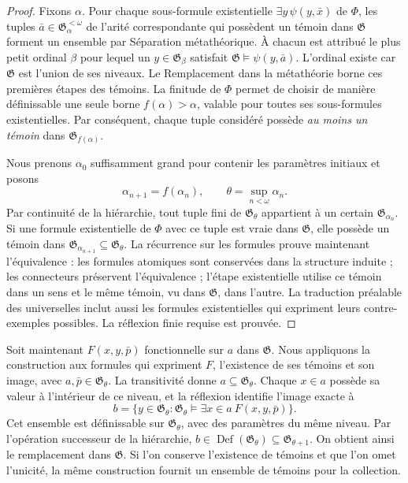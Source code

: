 \begin{proof}
Fixons \(\alpha\). Pour chaque sous-formule existentielle
\(\exists y\,\psi(y,\bar x)\) de \(\Phi\), les tuples
\(\bar a\in\mathfrak G_\alpha^{<\omega}\) de l’arité correspondante
qui possèdent un témoin dans \(\mathfrak G\) forment un ensemble par Séparation
métathéorique. À chacun est attribué le plus petit ordinal \(\beta\) pour lequel
un \(y\in\mathfrak G_\beta\) satisfait
\(\mathfrak G\models\psi(y,\bar a)\). L’ordinal existe car
\(\mathfrak G\) est l’union de ses niveaux. Le Remplacement dans la métathéorie
borne ces premières étapes des témoins. La finitude de \(\Phi\) permet
de choisir de manière définissable une seule borne \(f(\alpha)>\alpha\), valable pour
toutes ses sous-formules existentielles. Par conséquent, chaque tuple considéré possède
\emph{au moins un témoin} dans \(\mathfrak G_{f(\alpha)}\).

Nous prenons \(\alpha_0\) suffisamment grand pour contenir les paramètres
initiaux et posons
\[
 \alpha_{n+1}=f(\alpha_n),\qquad
 \theta=\sup_{n<\omega}\alpha_n.
\]
Par continuité de la hiérarchie, tout tuple fini de
\(\mathfrak G_\theta\) appartient à un certain \(\mathfrak G_{\alpha_n}\).
Si une formule existentielle de \(\Phi\) avec ce tuple est vraie dans
\(\mathfrak G\), elle possède un témoin dans
\(\mathfrak G_{\alpha_{n+1}}\subseteq\mathfrak G_\theta\).
La récurrence sur les formules prouve maintenant l’équivalence : les formules atomiques
sont conservées dans la structure induite ; les connecteurs préservent
l’équivalence ; l’étape existentielle utilise ce témoin dans un sens et le
même témoin, vu dans \(\mathfrak G\), dans l’autre. La traduction préalable
des universelles inclut aussi les formules existentielles qui expriment
leurs contre-exemples possibles. La réflexion finie requise est prouvée.
\end{proof}

Soit maintenant \(F(x,y,\bar p)\) fonctionnelle sur \(a\) dans \(\mathfrak G\). Nous appliquons la construction aux formules qui expriment \(F\), l'existence de ses témoins et son image, avec \(a,\bar p\in\mathfrak G_\theta\). La transitivité donne \(a\subseteq\mathfrak G_\theta\). Chaque \(x\in a\) possède sa valeur à l'intérieur de ce niveau, et la réflexion identifie l'image exacte à
\[
 b=\{y\in\mathfrak G_\theta:
       \mathfrak G_\theta\models
       \exists x\in a\ F(x,y,\bar p)\}.
\]
Cet ensemble est définissable sur \(\mathfrak G_\theta\), avec des paramètres du même niveau. Par l'opération successeur de la hiérarchie, \(b\in\operatorname{Def}(\mathfrak G_\theta)
\subseteq\mathfrak G_{\theta+1}\). On obtient ainsi le remplacement dans \(\mathfrak G\). Si l'on conserve l'existence de témoins et que l'on omet l'unicité, la même construction fournit un ensemble de témoins pour la collection.

